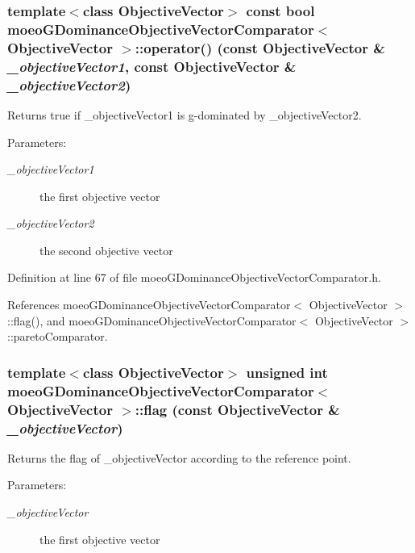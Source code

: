 \subsubsection{\setlength{\rightskip}{0pt plus 5cm}template$<$class Objective\-Vector$>$ const bool \bf{moeo\-GDominance\-Objective\-Vector\-Comparator}$<$ Objective\-Vector $>$::operator() (const Objective\-Vector \& {\em \_\-objective\-Vector1}, const Objective\-Vector \& {\em \_\-objective\-Vector2})\hspace{0.3cm}{\tt  [inline]}}\label{classmoeoGDominanceObjectiveVectorComparator_4b8c3496d77abf6e774333f3296e6d79}


Returns true if \_\-objective\-Vector1 is g-dominated by \_\-objective\-Vector2. 

\begin{Desc}
\item[Parameters:]
\begin{description}
\item[{\em \_\-objective\-Vector1}]the first objective vector \item[{\em \_\-objective\-Vector2}]the second objective vector \end{description}
\end{Desc}


Definition at line 67 of file moeo\-GDominance\-Objective\-Vector\-Comparator.h.

References moeo\-GDominance\-Objective\-Vector\-Comparator$<$ Objective\-Vector $>$::flag(), and moeo\-GDominance\-Objective\-Vector\-Comparator$<$ Objective\-Vector $>$::pareto\-Comparator.
\subsubsection{\setlength{\rightskip}{0pt plus 5cm}template$<$class Objective\-Vector$>$ unsigned int \bf{moeo\-GDominance\-Objective\-Vector\-Comparator}$<$ Objective\-Vector $>$::flag (const Objective\-Vector \& {\em \_\-objective\-Vector})\hspace{0.3cm}{\tt  [inline, private]}}\label{classmoeoGDominanceObjectiveVectorComparator_75bf5141369522563e60d4e3ac2ec9cb}


Returns the flag of \_\-objective\-Vector according to the reference point. 

\begin{Desc}
\item[Parameters:]
\begin{description}
\item[{\em \_\-objective\-Vector}]the first objective vector \end{description}
\end{Desc}


